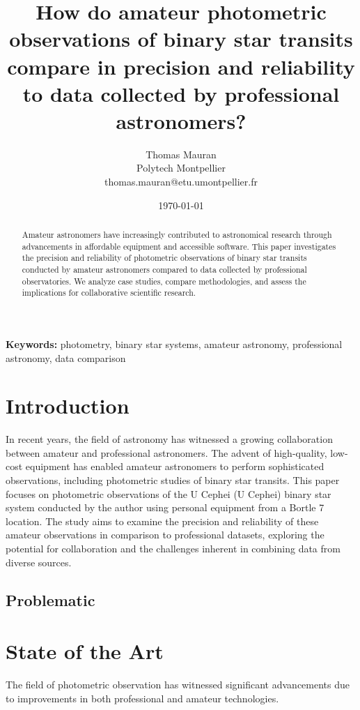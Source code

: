 \documentclass[12pt,a4paper]{article}
\title{How do amateur photometric observations of binary star transits compare in precision and reliability to data collected by professional astronomers?}
\author{Thomas Mauran \\\small Polytech Montpellier  \\\small thomas.mauran@etu.umontpellier.fr}
\date{\today}
\begin{document}
\maketitle

\begin{abstract}
Amateur astronomers have increasingly contributed to astronomical research through advancements in affordable equipment and accessible software. This paper investigates the precision and reliability of photometric observations of binary star transits conducted by amateur astronomers compared to data collected by professional observatories. We analyze case studies, compare methodologies, and assess the implications for collaborative scientific research.
\end{abstract}

\textbf{Keywords:} photometry, binary star systems, amateur astronomy, professional astronomy, data comparison

\newpage

\tableofcontents

\section{Introduction}
In recent years, the field of astronomy has witnessed a growing collaboration between amateur 
and professional astronomers. The advent of high-quality, low-cost equipment has enabled 
amateur astronomers to perform sophisticated observations, including photometric studies of 
binary star transits. This paper focuses on photometric observations of the U Cephei 
(U Cephei) binary star system conducted by the author using personal equipment from a 
Bortle 7 location. The study aims to examine the precision and reliability of these amateur 
observations in comparison to professional datasets, exploring the potential for collaboration
and the challenges inherent in combining data from diverse sources.

\subsection{Problematic}

\section{State of the Art}
The field of photometric observation has witnessed significant advancements due to improvements in both professional and amateur technologies. 
\end{document}
